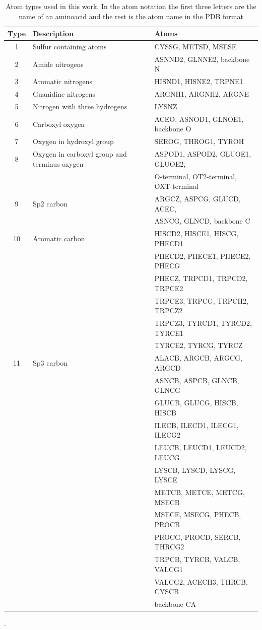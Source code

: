 \documentclass[a4paper,10pt]{article}
\begin{document}
\begin{table}[H]
\begin{center}
\begin{tabular}{ c | l | l }
    
    Type & Description & Atoms \\
    \hline
    1 & Sulfur containing atoms & CYSSG, METSD, MSESE \\ \hline
    2 & Amide nitrogens & ASNND2, GLNNE2, backbone N \\ \hline
    3 & Aromatic nitrogens & HISND1, HISNE2, TRPNE1 \\ \hline
    4 & Guanidine nitrogens & ARGNH1, ARGNH2, ARGNE \\ \hline
    5 & Nitrogen with three hydrogens & LYSNZ \\ \hline
    6 & Carboxyl oxygen & ACEO, ASNOD1, GLNOE1, backbone O \\ \hline
    7 & Oxygen in hydroxyl group & SEROG, THROG1, TYROH \\ \hline
    8 & Oxygen in carboxyl group and terminus oxygen & ASPOD1, ASPOD2, GLUOE1, GLUOE2, \\
     & &  O-terminal, OT2-terminal, OXT-terminal \\ \hline
    9 & Sp2 carbon & ARGCZ, ASPCG, GLUCD, ACEC, \\
     & & ASNCG, GLNCD, backbone C\\ \hline
    10 & Aromatic carbon & HISCD2, HISCE1, HISCG, PHECD1 \\
     & & PHECD2, PHECE1, PHECE2, PHECG \\ 
     & & PHECZ, TRPCD1, TRPCD2, TRPCE2 \\
     & & TRPCE3, TRPCG, TRPCH2, TRPCZ2 \\
     & & TRPCZ3, TYRCD1, TYRCD2, TYRCE1 \\
     & & TYRCE2, TYRCG, TYRCZ \\ \hline
    11 & Sp3 carbon & ALACB, ARGCB, ARGCG, ARGCD \\
     & & ASNCB, ASPCB, GLNCB, GLNCG \\
     & & GLUCB, GLUCG, HISCB, HISCB \\
     & & ILECB, ILECD1, ILECG1, ILECG2 \\
     & & LEUCB, LEUCD1, LEUCD2, LEUCG \\
     & & LYSCB, LYSCD, LYSCG, LYSCE \\
     & & METCB, METCE, METCG, MSECB \\
     & & MSECE, MSECG, PHECB, PROCB \\
     & & PROCG, PROCD, SERCB, THRCG2 \\
     & & TRPCB, TYRCB, VALCB, VALCG1 \\
     & & VALCG2, ACECH3, THRCB, CYSCB \\
     & & backbone CA \\ \hline
    
\end{tabular}
    
    \caption {Atom types used in this work. In the atom notation the first three letters are the name of an aminoacid and the rest is 
    the atom name in the PDB format \cite{}}.
    \label{Tbl:atomTypes}
\end{center}
\end{table}
\end{document}
